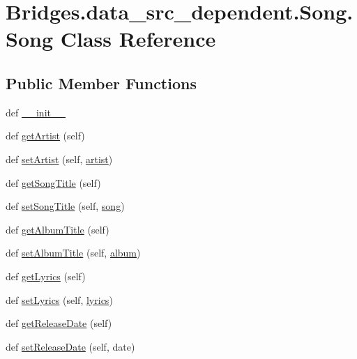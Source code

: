 \hypertarget{class_bridges_1_1data__src__dependent_1_1_song_1_1_song}{}\section{Bridges.\+data\+\_\+src\+\_\+dependent.\+Song.\+Song Class Reference}
\label{class_bridges_1_1data__src__dependent_1_1_song_1_1_song}
\subsection*{Public Member Functions}
\begin{DoxyCompactItemize}
\item 
def \hyperlink{class_bridges_1_1data__src__dependent_1_1_song_1_1_song_a589a2e9629b9b48f256423b49daa99f5}{\+\_\+\+\_\+init\+\_\+\+\_\+}
\item 
def \hyperlink{class_bridges_1_1data__src__dependent_1_1_song_1_1_song_ad98f04f8640edfe15625e2b0b47cffc8}{get\+Artist} (self)
\item 
def \hyperlink{class_bridges_1_1data__src__dependent_1_1_song_1_1_song_aae9f410763d54c86d79ac0cfdd6b74b1}{set\+Artist} (self, \hyperlink{class_bridges_1_1data__src__dependent_1_1_song_1_1_song_a5795d16070e4c03e50a45564eaf5fdbd}{artist})
\item 
def \hyperlink{class_bridges_1_1data__src__dependent_1_1_song_1_1_song_a0c53dddc70079bc9b06689447a04cb0c}{get\+Song\+Title} (self)
\item 
def \hyperlink{class_bridges_1_1data__src__dependent_1_1_song_1_1_song_ab9fd4e40e4ba58d7ddeb232e3cd4e2d4}{set\+Song\+Title} (self, \hyperlink{class_bridges_1_1data__src__dependent_1_1_song_1_1_song_ac6bc27c01975503ccc3fbbc3ffd946d4}{song})
\item 
def \hyperlink{class_bridges_1_1data__src__dependent_1_1_song_1_1_song_abb09ad38df92ba1a262207ffa527a816}{get\+Album\+Title} (self)
\item 
def \hyperlink{class_bridges_1_1data__src__dependent_1_1_song_1_1_song_ab79207975479924cb667813174b36732}{set\+Album\+Title} (self, \hyperlink{class_bridges_1_1data__src__dependent_1_1_song_1_1_song_ad561ff8cceff3a94985742b5a3dca73d}{album})
\item 
def \hyperlink{class_bridges_1_1data__src__dependent_1_1_song_1_1_song_a40d7a2e6f52c4edaa7e6f5c4d04c871f}{get\+Lyrics} (self)
\item 
def \hyperlink{class_bridges_1_1data__src__dependent_1_1_song_1_1_song_a516bb6cd3e8121cea6b92da6aff39bba}{set\+Lyrics} (self, \hyperlink{class_bridges_1_1data__src__dependent_1_1_song_1_1_song_a6f80e5527d273548b40819ca83a93bd5}{lyrics})
\item 
def \hyperlink{class_bridges_1_1data__src__dependent_1_1_song_1_1_song_aaef1b3c7385cb8549dffa4cfd9aa9a4d}{get\+Release\+Date} (self)
\item 
def \hyperlink{class_bridges_1_1data__src__dependent_1_1_song_1_1_song_a17db169716c6529a96b1d1a2c658064e}{set\+Release\+Date} (self, date)
\end{DoxyCompactItemize}
